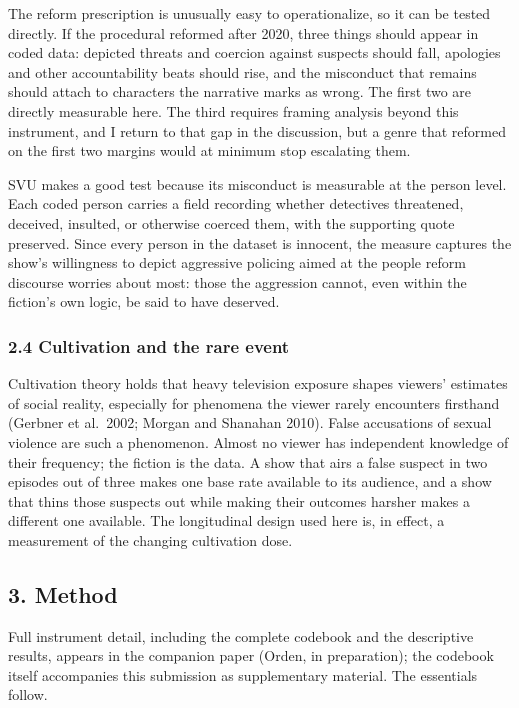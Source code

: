 \documentclass[
]{article}
\begin{document}
The reform prescription is unusually easy to operationalize, so it can
be tested directly. If the procedural reformed after 2020, three things
should appear in coded data: depicted threats and coercion against
suspects should fall, apologies and other accountability beats should
rise, and the misconduct that remains should attach to characters the
narrative marks as wrong. The first two are directly measurable here.
The third requires framing analysis beyond this instrument, and I return
to that gap in the discussion, but a genre that reformed on the first
two margins would at minimum stop escalating them.

SVU makes a good test because its misconduct is measurable at the person
level. Each coded person carries a field recording whether detectives
threatened, deceived, insulted, or otherwise coerced them, with the
supporting quote preserved. Since every person in the dataset is
innocent, the measure captures the show's willingness to depict
aggressive policing aimed at the people reform discourse worries about
most: those the aggression cannot, even within the fiction's own logic,
be said to have deserved.

\subsubsection{2.4 Cultivation and the rare
event}\label{cultivation-and-the-rare-event}

Cultivation theory holds that heavy television exposure shapes viewers'
estimates of social reality, especially for phenomena the viewer rarely
encounters firsthand (Gerbner et al.~2002; Morgan and Shanahan 2010).
False accusations of sexual violence are such a phenomenon. Almost no
viewer has independent knowledge of their frequency; the fiction is the
data. A show that airs a false suspect in two episodes out of three
makes one base rate available to its audience, and a show that thins
those suspects out while making their outcomes harsher makes a different
one available. The longitudinal design used here is, in effect, a
measurement of the changing cultivation dose.

\subsection{3. Method}\label{method}

Full instrument detail, including the complete codebook and the
descriptive results, appears in the companion paper (Orden, in
preparation); the codebook itself accompanies this submission as
supplementary material. The essentials follow.
\end{document}
